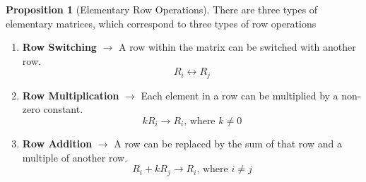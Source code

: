 \documentclass[a4paper]{article}
\theoremstyle{definition}
\newtheorem*{prop}{Proposition}
\begin{document}
\begin{prop}[Elementary Row Operations]
     There are three types of elementary matrices, which correspond to three
     types of row operations
      \begin{enumerate}
          \item \textbf{Row Switching} $\rightarrow$ A row within the matrix can be
          switched with another row.
             \begin{equation*}
                  R_i \leftrightarrow R_j
             \end{equation*}
          \item \textbf{Row Multiplication} $\rightarrow$ Each element in a row
          can be multiplied by a non-zero constant.
          \begin{equation*}
               kR_i \rightarrow R_i \text{, where $k \neq 0$}
          \end{equation*}
          \item \textbf{Row Addition} $\rightarrow$ A row can be replaced by the
          sum of that row and a multiple of another row.
          \begin{equation*}
               R_i + kR_j \rightarrow R_i \text{, where $i \neq j$}
          \end{equation*}
      \end{enumerate}
\end{prop}
\end{document}
